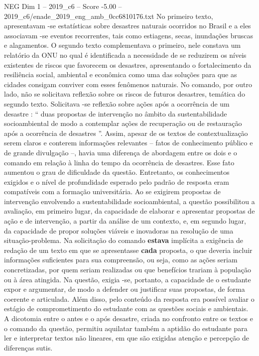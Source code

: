\begin{textsample}{NEG Dim 1 – 2019\_c6 – Score -5.00 – 2019\_c6/enade\_2019\_eng\_amb\_0cc6810176.txt}
No primeiro texto, apresentavam -se estatísticas sobre desastres naturais ocorridos no Brasil e a eles associavam -se eventos recorrentes, tais como estiagens, secas, inundações bruscas e alagamentos.
O segundo texto complementava o primeiro, nele constava um relatório da ONU no qual é identificada a necessidade de se reduzirem os níveis existentes de riscos que favorecem os desastres, apresentando o fortalecimento da resiliência social, ambiental e econômica como uma das soluções para que as cidades consigam conviver com esses fenômenos naturais.
No comando, por outro lado, não se solicitava reflexão sobre os riscos de futuros desastres, temática do segundo texto.
Solicitava -se reflexão sobre ações após a ocorrência de um desastre : “ duas propostas de intervenção no âmbito da sustentabilidade socioambiental de modo a contemplar ações de recuperação ou de restauração após a ocorrência de desastres ”.
Assim, apesar de os textos de contextualização serem claros e conterem informações relevantes – fatos de conhecimento público e de grande divulgação –, havia uma diferença de abordagem entre os dois e o comando em relação à linha do tempo da ocorrência de desastres.
Esse fato aumentou o grau de dificuldade da questão.
Entretanto, os conhecimentos exigidos e o nível de profundidade esperado pelo padrão de resposta eram compatíveis com a formação universitária.
Ao se exigirem propostas de intervenção envolvendo a sustentabilidade socioambiental, a questão possibilitou a avaliação, em primeiro lugar, da capacidade de elaborar e apresentar propostas de ação e de intervenção, a partir da análise de um contexto, e, em segundo lugar, da capacidade de propor soluções viáveis e inovadoras na resolução de uma situação-problema.
Na solicitação do comando \textbf{estava} implícita a exigência de redação de um texto em que se apresentasse \textbf{cada} proposta, o que deveria incluir informações suficientes para sua compreensão, ou seja, como as ações seriam concretizadas, por quem seriam realizadas ou que benefícios trariam à população ou à área atingida.
Na questão, exigia -se, portanto, a capacidade de o estudante expor e argumentar, de modo a defender ou justificar suas propostas, de forma coerente e articulada.
Além disso, pelo conteúdo da resposta era possível avaliar o estágio de comprometimento do estudante com as questões sociais e ambientais.
A dicotomia entre o antes e o após desastre, criada no confronto entre os textos e o comando da questão, permitiu aquilatar também a aptidão do estudante para ler e interpretar textos não lineares, em que são exigidas atenção e percepção de diferenças sutis.

\end{textsample}
